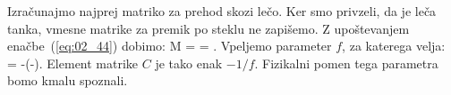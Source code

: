 Izračunajmo najprej matriko za prehod skozi lečo. Ker smo privzeli, da je leča tanka, 
vmesne matrike za premik po steklu ne zapišemo. Z upoštevanjem enačbe~(\ref{eq:02_44})
dobimo:
\beq
 M = \cdot 
{} = 
\!\!.
\label{eq:02_47}
\eeq
Vpeljemo parameter $f$, za katerega velja:
\beq
{} = -\left(-\right)\!\!.
\label{eq:02_48}
\eeq
Element matrike $C$ je tako enak $-1/f$. Fizikalni pomen tega parametra
bomo kmalu spoznali.

